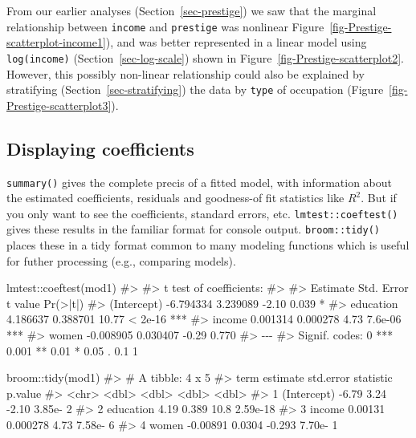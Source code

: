 \documentclass[
  letterpaper,
  10pt,
  krantz2]{krantz}
\makeatletter
\newenvironment{Shaded}{\begin{snugshade}}{\end{snugshade}}
\newcommand{\CommentTok}[1]{\textcolor[rgb]{0.37,0.37,0.37}{#1}}
\newcommand{\FunctionTok}[1]{\textcolor[rgb]{0.28,0.35,0.67}{#1}}
\newcommand{\NormalTok}[1]{\textcolor[rgb]{0.00,0.23,0.31}{#1}}
\newcommand{\SpecialCharTok}[1]{\textcolor[rgb]{0.37,0.37,0.37}{#1}}
\newenvironment{kframe}{%
  \medskip{}
  \setlength{\fboxsep}{.8em}
  \def\at@end@of@kframe{}%
  \ifinner\ifhmode%
  \def\at@end@of@kframe{\end{minipage}}%
  \begin{minipage}{\columnwidth}%
  \fi\fi%
  \def\FrameCommand##1{\hskip\@totalleftmargin \hskip-\fboxsep
  \colorbox{shadecolor}{##1}\hskip-\fboxsep
      \hskip-\linewidth \hskip-\@totalleftmargin \hskip\columnwidth}%
  \MakeFramed {\advance\hsize-\width
    \@totalleftmargin\z@ \linewidth\hsize
    \@setminipage}}%
{\par\unskip\endMakeFramed%
  \at@end@of@kframe}
\renewenvironment{Shaded}{\begin{kframe}}{\end{kframe}}
\makeatother
\begin{document}
From our earlier analyses (Section~\ref{sec-prestige}) we saw that the
marginal relationship between \texttt{income} and \texttt{prestige} was
nonlinear Figure~\ref{fig-Prestige-scatterplot-income1}), and was better
represented in a linear model using \texttt{log(income)}
(Section~\ref{sec-log-scale}) shown in
Figure~\ref{fig-Prestige-scatterplot2}. However, this possibly
non-linear relationship could also be explained by stratifying
(Section~\ref{sec-stratifying}) the data by \texttt{type} of occupation
(Figure~\ref{fig-Prestige-scatterplot3}).

\subsection{Displaying coefficients}\label{displaying-coefficients}

\texttt{summary()} gives the complete precis of a fitted model, with
information about the estimated coefficients, residuals and goodness-of
fit statistics like \(R^2\). But if you only want to see the
coefficients, standard errors, etc. \texttt{lmtest::coeftest()} gives
these results in the familiar format for console output.
\texttt{broom::tidy()} places these in a tidy format common to many
modeling functions which is useful for futher processing (e.g.,
comparing models).

\begin{Shaded}
\begin{Highlighting}[]
\NormalTok{lmtest}\SpecialCharTok{::}\FunctionTok{coeftest}\NormalTok{(mod1)}
\CommentTok{\#\textgreater{} }
\CommentTok{\#\textgreater{} t test of coefficients:}
\CommentTok{\#\textgreater{} }
\CommentTok{\#\textgreater{}              Estimate Std. Error t value Pr(\textgreater{}|t|)    }
\CommentTok{\#\textgreater{} (Intercept) {-}6.794334   3.239089   {-}2.10    0.039 *  }
\CommentTok{\#\textgreater{} education    4.186637   0.388701   10.77  \textless{} 2e{-}16 ***}
\CommentTok{\#\textgreater{} income       0.001314   0.000278    4.73  7.6e{-}06 ***}
\CommentTok{\#\textgreater{} women       {-}0.008905   0.030407   {-}0.29    0.770    }
\CommentTok{\#\textgreater{} {-}{-}{-}}
\CommentTok{\#\textgreater{} Signif. codes:  0 \textquotesingle{}***\textquotesingle{} 0.001 \textquotesingle{}**\textquotesingle{} 0.01 \textquotesingle{}*\textquotesingle{} 0.05 \textquotesingle{}.\textquotesingle{} 0.1 \textquotesingle{} \textquotesingle{} 1}

\NormalTok{broom}\SpecialCharTok{::}\FunctionTok{tidy}\NormalTok{(mod1)}
\CommentTok{\#\textgreater{} \# A tibble: 4 x 5}
\CommentTok{\#\textgreater{}   term        estimate std.error statistic  p.value}
\CommentTok{\#\textgreater{}   \textless{}chr\textgreater{}          \textless{}dbl\textgreater{}     \textless{}dbl\textgreater{}     \textless{}dbl\textgreater{}    \textless{}dbl\textgreater{}}
\CommentTok{\#\textgreater{} 1 (Intercept) {-}6.79     3.24        {-}2.10  3.85e{-} 2}
\CommentTok{\#\textgreater{} 2 education    4.19     0.389       10.8   2.59e{-}18}
\CommentTok{\#\textgreater{} 3 income       0.00131  0.000278     4.73  7.58e{-} 6}
\CommentTok{\#\textgreater{} 4 women       {-}0.00891  0.0304      {-}0.293 7.70e{-} 1}
\end{Highlighting}
\end{Shaded}
\end{document}
